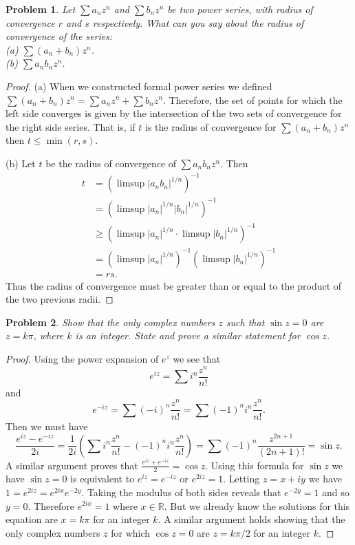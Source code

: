 \documentclass{article}
\newtheorem{problem}{Problem}
\begin{document}
\begin{problem}
Let $\sum a_n z^n$ and $\sum b_n z^n$ be two power series, with radius of convergence $r$ and $s$ respectively. What can you say about the radius of convergence of the series:\\
(a) $\sum (a_n + b_n)z^n$.\\
(b) $\sum a_n b_n z^n$.
\end{problem}
\begin{proof}
(a) When we constructed formal power series we defined $\sum (a_n + b_n)z^n = \sum a_n z^n + \sum b_n z^n$. Therefore, the set of points for which the left side converges is given by the intersection of the two sets of convergence for the right side series. That is, if $t$ is the radius of convergence for $\sum (a_n + b_n) z^n$ then $t \leq \min (r,s)$.

(b) Let $t$ be the radius of convergence of $\sum a_n b_n z^n$. Then
\begin{align*}
t
&= (\limsup |a_n b_n|^{1/n})^{-1} \\
&= (\limsup |a_n|^{1/n} |b_n|^{1/n})^{-1} \\
&\geq (\limsup |a_n|^{1/n} \cdot \limsup |b_n|^{1/n})^{-1} \\
&= (\limsup |a_n|^{1/n})^{-1} (\limsup |b_n|^{1/n})^{-1} \\
&= rs.
\end{align*}
Thus the radius of convergence must be greater than or equal to the product of the two previous radii.
\end{proof}

\begin{problem}
Show that the only complex numbers $z$ such that $\sin z = 0$ are $z = k \pi$, where $k$ is an integer. State and prove a similar statement for $\cos z$.
\end{problem}
\begin{proof}
Using the power expansion of $e^z$ we see that
\[
e^{iz} = \sum i^n \frac{z^n}{n!}
\]
and
\[
e^{-iz} = \sum (-i)^n \frac{z^n}{n!} = \sum (-1)^n i^n \frac{z^n}{n!}.
\]
Then we must have
\[
\frac{e^{iz}-e^{-iz}}{2i} = \frac{1}{2i} \left ( \sum i^n \frac{z^n}{n!} - (-1)^n i^n \frac{z^n}{n!} \right ) = \sum (-1)^n \frac{z^{2n+1}}{(2n+1)!} = \sin z.
\]
A similar argument proves that $\frac{e^{iz} + e^{-iz}}{2} = \cos z$. Using this formula for $\sin z$ we have $\sin z = 0$ is equivalent to $e^{iz} = e^{-iz}$ or $e^{2iz} = 1$. Letting $z = x + iy$ we have $1 = e^{2iz} = e^{2ix}e^{-2y}$. Taking the modulus of both sides reveals that $e^{-2y} = 1$ and so $y = 0$. Therefore $e^{2ix} = 1$ where $x \in \mathbb{R}$. But we already know the solutions for this equation are $x = k \pi$ for an integer $k$. A similar argument holds showing that the only complex numbers $z$ for which $\cos z = 0$ are $z = k\pi/2$ for an integer $k$.
\end{proof}
\end{document}
